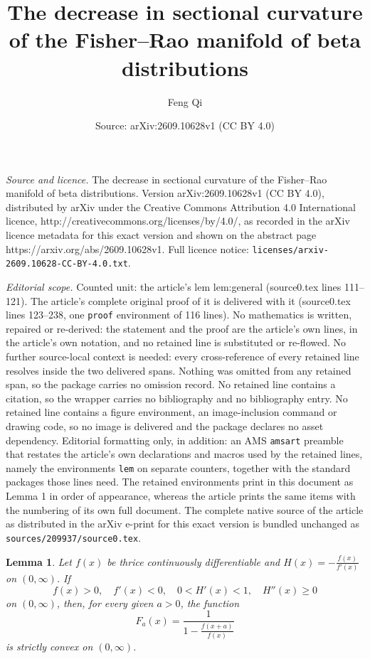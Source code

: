 \documentclass[10pt,a4paper]{amsart}
\title{The decrease in sectional curvature of the Fisher--Rao manifold of beta distributions}
\author{Feng Qi}
\date{Source: arXiv:2609.10628v1 (CC BY 4.0)}
\newtheorem{lem}{Lemma}
\begin{document}
\maketitle

\noindent\emph{Source and licence.} The decrease in sectional curvature of the Fisher--Rao manifold of beta distributions. Version arXiv:2609.10628v1 (CC BY 4.0), distributed by arXiv under the Creative Commons Attribution 4.0 International licence, http://creativecommons.org/licenses/by/4.0/, as recorded in the arXiv licence metadata for this exact version and shown on the abstract page https://arxiv.org/abs/2609.10628v1. Full licence notice: \texttt{licenses/arxiv-2609.10628-CC-BY-4.0.txt}.\par\smallskip

\noindent\textit{Editorial scope.} Counted unit: the article's lem lem:general (source0.tex lines 111--121). The article's complete original proof of it is delivered with it (source0.tex lines 123--238, one \texttt{proof} environment of 116 lines). No mathematics is written, repaired or re-derived: the statement and the proof are the article's own lines, in the article's own notation, and no retained line is substituted or re-flowed.  No further source-local context is needed: every cross-reference of every retained line resolves inside the two delivered spans.  Nothing was omitted from any retained span, so the package carries no omission record.  No retained line contains a citation, so the wrapper carries no bibliography and no bibliography entry.  No retained line contains a figure environment, an image-inclusion command or drawing code, so no image is delivered and the package declares no asset dependency.  Editorial formatting only, in addition: an AMS \texttt{amsart} preamble that restates the article's own declarations and macros used by the retained lines, namely the environments \texttt{lem} on separate counters, together with the standard packages those lines need.  The retained environments print in this document as Lemma 1 in order of appearance, whereas the article prints the same items with the numbering of its own full document.  The complete native source of the article as distributed in the arXiv e-print for this exact version is bundled unchanged as \texttt{sources/209937/source0.tex}.
\begin{lem}\label{lem:general}
Let $f(x)$ be thrice continuously differentiable and $H(x)=-\frac{f(x)}{f'(x)}$ on $(0,\infty)$. If
$$
f(x)>0,\quad f'(x)<0, \quad 0<H'(x)<1, \quad H''(x)\geq 0
$$
on $(0,\infty)$, then, for every given $a>0$, the function
$$
F_a(x)=\frac{1}{1-\frac{f(x+a)}{f(x)}}
$$
is strictly convex on $(0,\infty)$.
\end{lem}
\end{document}
